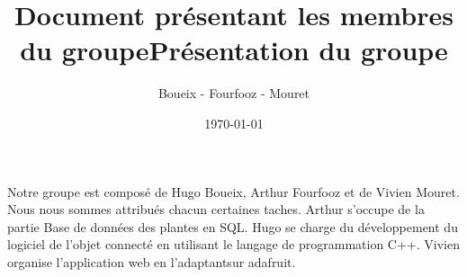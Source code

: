 \documentclass{article}
\title{Document présentant les membres du groupe}
\author{Boueix - Fourfooz - Mouret}
\date\today
\begin{document}
\title{Présentation du groupe}

	Notre groupe est composé de Hugo Boueix, Arthur Fourfooz et de Vivien Mouret.
	Nous nous sommes attribués chacun certaines taches.
	Arthur s'occupe de la partie Base de données des plantes en SQL.
	Hugo se charge du développement du logiciel de l'objet connecté en utilisant le langage de programmation C++.
	Vivien organise l'application web en l'adaptantsur adafruit.
\end{document}
